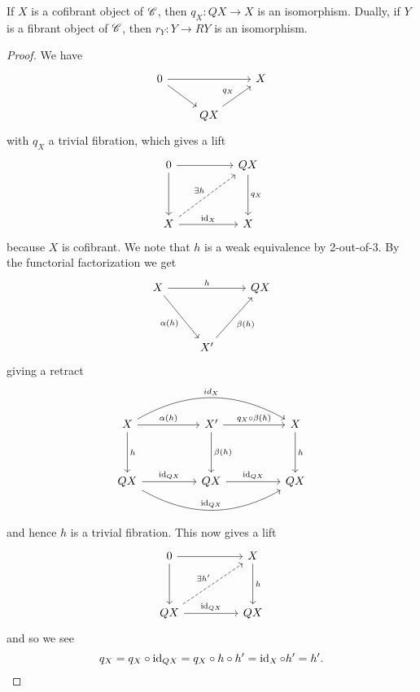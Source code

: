 \documentclass[10pt]{amsart}
\begin{document}
\begin{lem}
  If $X$ is a cofibrant object of $\mathscr{C}$, then $q_X \colon QX \to X$ is an isomorphism.
  Dually, if $Y$ is a fibrant object of $\mathscr{C}$, then $r_Y \colon Y \to RY$ is an isomorphism.
  
  \begin{proof}
    We have
    $$\begin{tikzcd}
      0 \arrow{rd}\arrow{rr} & & X\\
      & QX\arrow{ur}{q_X}
    \end{tikzcd}$$
    with $q_X$ a trivial fibration, which gives a lift
    $$\begin{tikzcd}
      0 \arrow{rr}\arrow{dd} && QX \arrow{dd}{q_X}\\
      \\
      X \arrow[dashed]{rruu}{\exists h}\arrow{rr}{\id_X} && X
    \end{tikzcd}$$
    because $X$ is cofibrant.
    We note that $h$ is a weak equivalence by 2-out-of-3.
    By the functorial factorization we get
    $$\begin{tikzcd}
      X \arrow{rr}{h}\arrow[swap]{ddr}{\alpha(h)} && QX\\
        \\
      & X^\prime \arrow[swap]{uur}{\beta(h)}
    \end{tikzcd}$$
    giving a retract
    $$\begin{tikzcd}
      X \arrow[bend left]{rrrr}{id_{X}}\arrow{rr}{\alpha(h)}\arrow{dd}{h} && X^\prime \arrow{rr}{q_X \circ \beta(h)}\arrow{dd}{\beta(h)} && X\arrow{dd}{h}\\
      \\
      QX \arrow[bend right]{rrrr}{\id_{QX}}\arrow{rr}{\id_{QX}} && QX \arrow{rr}{\id_{QX}} && QX
    \end{tikzcd}$$
    and hence $h$ is a trivial fibration.
    This now gives a lift
    $$\begin{tikzcd}
      0 \arrow{rr}\arrow{dd} && X\arrow{dd}{h}\\
      \\
      QX \arrow{rr}{\id_{QX}}\arrow[dashed]{rruu}{\exists h^\prime} && QX
    \end{tikzcd}$$
    and so we see
    $$q_X = q_X \circ \operatorname{id}_{QX} = q_X \circ h \circ h^\prime = \operatorname{id}_X \circ h^\prime = h^\prime.$$
  \end{proof}
\end{lem}
\end{document}
